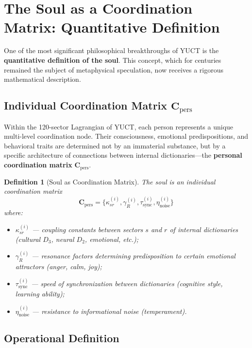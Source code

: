 \documentclass[12pt,a4paper]{article}
\newcommand{\Cpers}{\mathbf{C}_{\text{pers}}}
\newtheorem{definition}{Definition}[section]
\begin{document}
	\section{The Soul as a Coordination Matrix: Quantitative Definition}
	\label{sec:soul}
	
	One of the most significant philosophical breakthroughs of YUCT is the \textbf{quantitative definition of the soul}. This concept, which for centuries remained the subject of metaphysical speculation, now receives a rigorous mathematical description.
	
	\subsection{Individual Coordination Matrix \(\Cpers\)}
	
	Within the 120-sector Lagrangian of YUCT, each person represents a unique multi-level coordination node. Their consciousness, emotional predispositions, and behavioral traits are determined not by an immaterial substance, but by a specific architecture of connections between internal dictionaries—the \textbf{personal coordination matrix} \(\Cpers\).
	
	\begin{definition}[Soul as Coordination Matrix]
		The soul is an individual coordination matrix
		\[
		\Cpers = \{\kappa_{sr}^{(i)}, \gamma_R^{(i)}, \tau_{\text{sync}}^{(i)}, \eta_{\text{noise}}^{(i)}\}
		\]
		where:
		\begin{itemize}
			\item \(\kappa_{sr}^{(i)}\) — coupling constants between sectors \(s\) and \(r\) of internal dictionaries (cultural \(D_3\), neural \(D_2\), emotional, etc.);
			\item \(\gamma_R^{(i)}\) — resonance factors determining predisposition to certain emotional attractors (anger, calm, joy);
			\item \(\tau_{\text{sync}}^{(i)}\) — speed of synchronization between dictionaries (cognitive style, learning ability);
			\item \(\eta_{\text{noise}}^{(i)}\) — resistance to informational noise (temperament).
		\end{itemize}
	\end{definition}
	
	\subsection{Operational Definition}
	
\end{document}
